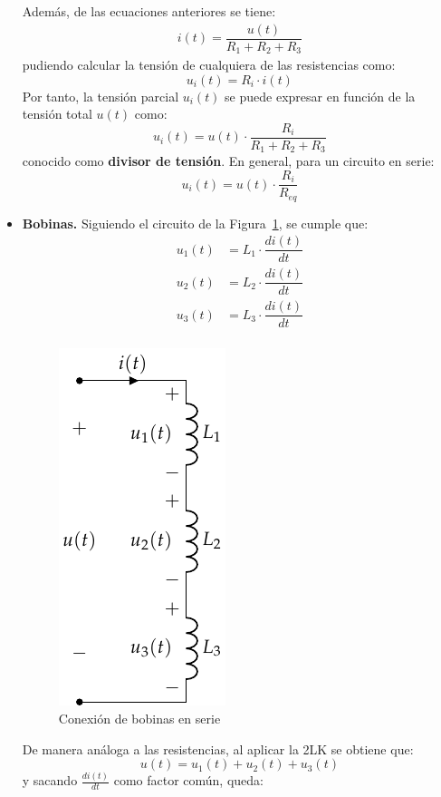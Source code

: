 \documentclass[11pt]{book} %
\numberwithin{dummy}{section}
\theoremstyle{ocrenumbox}
\theoremstyle{blacknumex}
\theoremstyle{blacknumbox}
\theoremstyle{ocrenum}
\begin{document}
\begin{itemize}
		Además, de las ecuaciones anteriores se tiene:
		\begin{align*}
			i(t) = \dfrac{u(t)}{R_1 + R_2 + R_3}
		\end{align*}
		pudiendo calcular la tensión de cualquiera de las resistencias como: 
		\begin{equation*}
			u_i(t) = R_i \cdot i(t)
		\end{equation*}
		Por tanto, la tensión parcial $u_i(t)$ se puede expresar en función de la tensión total $u(t)$ como: 
		\begin{equation*}
			u_i(t) = u(t) \cdot \frac{R_i}{R_1 + R_2 + R_3}
		\end{equation*}
		conocido como \textbf{divisor de tensión}. En general, para un circuito en serie:
		\begin{equation}
			\boxed{u_i(t) = u(t) \cdot \frac{R_i}{R_{eq}}}
		\end{equation}
		\item \textbf{Bobinas.} Siguiendo el circuito de la Figura~\ref{fig.bobinas-serie}, se cumple que:
		\begin{align*}
			u_1(t) &= L_1 \cdot \dfrac{di(t)}{dt}\\
			u_2(t) &= L_2 \cdot \dfrac{di(t)}{dt}\\
			u_3(t) &= L_3 \cdot \dfrac{di(t)}{dt}\\
		\end{align*}
		\begin{figure}[htbp]
			\centering
			\includegraphics[width=0.2\linewidth]{../figs/BobinasSerie.pdf}
			\caption{Conexión de bobinas en serie}
			\label{fig.bobinas-serie}
		\end{figure}
		De manera análoga a las resistencias, al aplicar la 2LK se obtiene que: 
		\begin{equation*}
			u(t) = u_1(t) + u_2(t) + u_3(t)
		\end{equation*}
		y sacando $\frac{di(t)}{dt}$ como factor común, queda:
		\begin{equation*}

\end{equation*}
\end{itemize}
\end{document}
